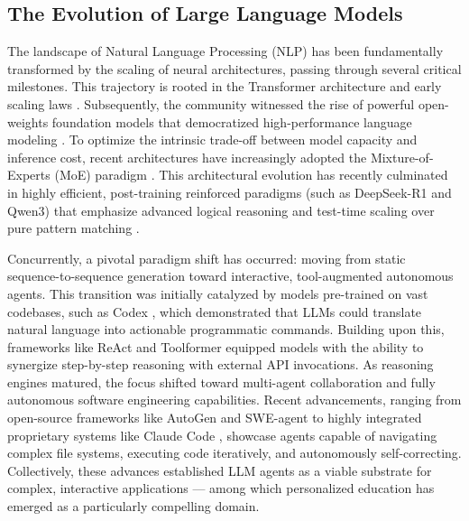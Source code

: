 \documentclass[10pt,conference]{IEEEtran}
\begin{document}
\subsection{The Evolution of Large Language Models}
The landscape of Natural Language Processing (NLP) has been fundamentally transformed by the scaling of neural architectures, passing through several critical milestones. This trajectory is rooted in the Transformer architecture and early scaling laws \cite{vaswani2017attention, brown2020language}. Subsequently, the community witnessed the rise of powerful open-weights foundation models that democratized high-performance language modeling \cite{touvron2023llama, bai2023qwen}. To optimize the intrinsic trade-off between model capacity and inference cost, recent architectures have increasingly adopted the Mixture-of-Experts (MoE) paradigm \cite{yang2024qwen2, qwen252024, jiang2024mixtral}. This architectural evolution has recently culminated in highly efficient, post-training reinforced paradigms (such as DeepSeek-R1 and Qwen3) that emphasize advanced logical reasoning and test-time scaling over pure pattern matching \cite{deepseek2024v3, qwen32025}.

Concurrently, a pivotal paradigm shift has occurred: moving from static sequence-to-sequence generation toward interactive, tool-augmented autonomous agents. This transition was initially catalyzed by models pre-trained on vast codebases, such as Codex \cite{chen2021codex}, which demonstrated that LLMs could translate natural language into actionable programmatic commands. Building upon this, frameworks like ReAct \cite{yao2023react} and Toolformer \cite{schick2023toolformer} equipped models with the ability to synergize step-by-step reasoning with external API invocations. As reasoning engines matured, the focus shifted toward multi-agent collaboration and fully autonomous software engineering capabilities. Recent advancements, ranging from open-source frameworks like AutoGen and SWE-agent \cite{wu2023autogen, yang2024sweagent} to highly integrated proprietary systems like Claude Code \cite{anthropic2025claudecode}, showcase agents capable of navigating complex file systems, executing code iteratively, and autonomously self-correcting. Collectively, these advances established LLM agents as a viable substrate for complex, interactive applications — among which personalized education has emerged as a particularly compelling domain.
\end{document}
